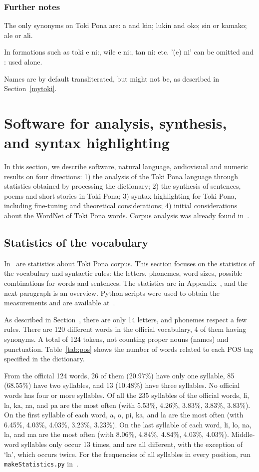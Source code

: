 \documentclass{article}
\newcommand{\tttt}[1]{\texttt{#1}}
\begin{document}
\subsubsection{Further notes}
The only synonyms on Toki Pona are:
a and kin; lukin and oko;
sin or kamako;
ale or ali.

In formations such as
toki e ni:, wile e ni:, tan ni: etc.
'(e) ni' can be omitted and : used alone.

Names are by default transliterated,
but might not be, as described in Section~\ref{mytoki}.


\section{Software for analysis, synthesis, and syntax highlighting}\label{hacks}
In this section,
we describe software, natural language, audiovisual and numeric results
on four directions:
1)
the analysis of the Toki Pona language through statistics
obtained by processing the dictionary;
2)
the synthesis of sentences, poems and short stories
in Toki Pona;
3)
syntax highlighting for Toki Pona,
including fine-tuning and theoretical
considerations;
4)
initial considerations about the WordNet of
Toki Pona words.
Corpus analysis was already found in~\cite{}.

\subsection{Statistics of the vocabulary}
In~\cite{pije} are statistics about Toki Pona corpus.
This section focuses on the statistics of the vocabulary
and syntactic rules:
the letters, phonemes, word sizes,
possible combinations for words and sentences.
The statistics are in Appendix~\cite{listings},
and the next paragraph is an overview.
Python scripts were used to obtain the measurements
and are available at~\cite{tokipona}.

As described in Section~\cite{basics},
there are only 14 letters,
and phonemes respect a few rules.
There are 120 different words in the official vocabulary,
4 of them having synonyms.
A total of 124 tokens,
not counting proper nouns (names)
and punctuation.
Table~\ref{tab:pos} shows the number of words
related to each POS tag specified in the dictionary.



From the official 124 words, 
26 of them (20.97\%)
have only one syllable,
85 (68.55\%) have two syllables,
and 13 (10.48\%) have three syllables.
No official words has four or more syllables.
Of all the 235 syllables of the official words,
li, la, ka, na, and pa are the most often (with 5.53\%,
4.26\%, 3.83\%,  3.83\%, 3.83\%).
On the first syllable of each word,
a, o, pi, ka, and la are the most often
(with 6.45\%, 4.03\%, 4.03\%, 3.23\%, 3.23\%).
On the last syllable of each word,
li, lo, na, la, and ma are the most often
(with 8.06\%, 4.84\%, 4.84\%, 4.03\%, 4.03\%).
Middle-word syllables only occur 13 times,
and are all different, with the exception of `la',
which occurs twice.
For the frequencies of all syllables in every position,
run \tttt{makeStatistics.py} in~\cite{tokipona}.
\end{document}
